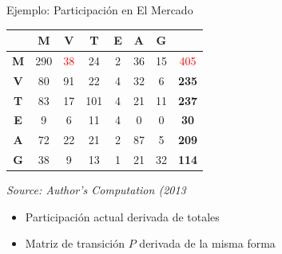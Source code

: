 \documentclass{beamer}
\begin{document}
\begin{frame}{Ejemplo: Participación en El Mercado}
\begin{center}
{{\begin{tabular}{|c|c|c|c|c|c|c|c|}
&\textbf{M} & \textbf{V} & \textbf{T} & \textbf{E} & \textbf{A} & \textbf{G} & \\ \hline
\textbf{M} & 290 & \textcolor{red}{38} & 24 & 2 & 36 & 15 & \textcolor{red}{405} \\
\hline
\textbf{V} & 80 & 91 & 22 & 4 & 32 & 6 & \textbf{235} \\
\hline
\textbf{T} & 83 & 17 & 101 & 4 & 21 & 11 & \textbf{237} \\
\hline
\textbf{E} & 9 & 6 & 11 & 4 & 0 & 0 & \textbf{30} \\
\hline
\textbf{A} & 72 & 22 & 21 & 2 & 87 & 5 & \textbf{209} \\
\hline
\textbf{G} & 38 & 9 & 13 & 1 & 21 & 32 & \textbf{114} \\
\hline
\end{tabular}}}
{\textit{Source: Author's Computation (2013}}
\end{center}
\begin{itemize}
\item<2->{Participación actual derivada de totales
}

\item<3>{Matriz de transición $P$ derivada de la misma forma
}
\end{itemize}
\end{frame}
\end{document}
